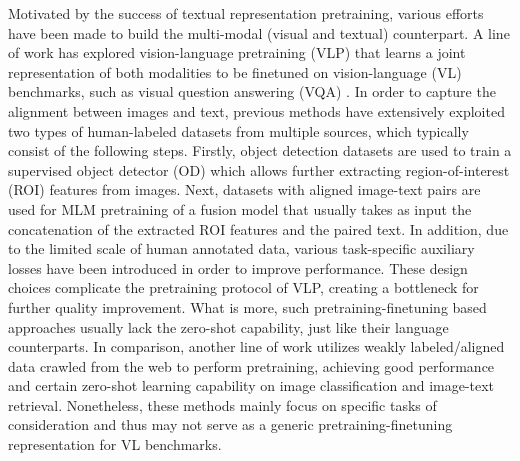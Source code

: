 \documentclass{article} \usepackage{iclr2022_conference,times}
\begin{document}
Motivated by the success of textual representation pretraining,
various efforts have been made to build the multi-modal (visual and textual) counterpart.
A line of work \citep{tan-bansal-2019-lxmert,jiasen2019vilbert,li2019visualbert,chen2020uniter,li2020oscar,Su2020VL-BERT,Zhang_2021_CVPR}
has explored vision-language pretraining (VLP) that learns a joint representation of both modalities to be finetuned on vision-language (VL) benchmarks,
such as visual question answering (VQA) \citep{goyal2017making}.
In order to capture the alignment between images and text,
previous methods have extensively exploited two types of human-labeled datasets from multiple sources, which typically consist of the following steps.
Firstly, object detection datasets are used to train a supervised object detector (OD) which allows further extracting region-of-interest (ROI) features from images.
Next, datasets with aligned image-text pairs are used for MLM pretraining of a fusion model that usually takes as input the concatenation of the extracted ROI features and the paired text. In addition, due to the limited scale of human annotated data,
various task-specific auxiliary losses have been introduced in order to improve performance. These design choices complicate the pretraining protocol of VLP,
creating a bottleneck for further quality improvement.
What is more, such pretraining-finetuning based approaches usually lack the zero-shot capability, just like their language counterparts.
In comparison, another line of work \citep{radford2021learning,ramesh2021zero,jia2021scaling}
utilizes weakly labeled/aligned data crawled from the web to perform pretraining,
achieving good performance and certain zero-shot learning capability on image classification and image-text retrieval.
Nonetheless, these methods mainly focus on specific tasks of consideration and thus may not serve as a generic pretraining-finetuning representation for VL benchmarks.
\end{document}
